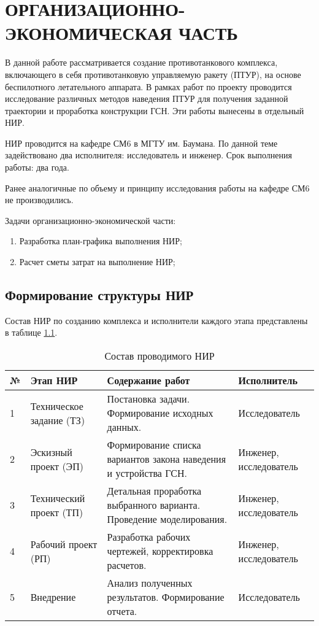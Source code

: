 \chapter{ОРГАНИЗАЦИОННО-ЭКОНОМИЧЕСКАЯ ЧАСТЬ}
\label{cha:ch_5}

В данной работе рассматривается создание противотанкового комплекса, включающего в себя противотанковую управляемую ракету (ПТУР), на основе беспилотного летательного аппарата. В рамках работ по проекту проводится исследование различных методов наведения ПТУР для получения заданной траектории и проработка конструкции ГСН. Эти работы вынесены в отдельный НИР.

НИР проводится на кафедре СМ6 в МГТУ им. Баумана. По данной теме задействовано два исполнителя: исследователь и инженер. Срок выполнения работы: два года.

Ранее аналогичные по объему и принципу исследования работы на кафедре СМ6 не производились.

Задачи организационно-экономической части:
\begin{enumerate}[1.]
	\item Разработка план-графика выполнения НИР;
	\item Расчет сметы затрат на выполнение НИР;
\end{enumerate}

\clearpage
\section{Формирование структуры НИР}
Состав НИР по созданию комплекса и исполнители каждого этапа представлены в таблице \ref{tab:econ_nir_struct}.
\begin{table}[h]
	\begin{center}
		\caption{Состав проводимого НИР}
		\begin{tabular}{|p{8mm}|p{30mm}|p{70mm}|p{40mm}|}
  		\hline
№ & Этап НИР & Содержание работ & Исполнитель \\ \hline
1 & Техническое задание (ТЗ) & Постановка задачи. Формирование исходных данных. & Исследователь \\ \hline
2 & Эскизный проект (ЭП) & Формирование списка вариантов закона наведения и устройства ГСН. & Инженер, исследователь \\ \hline
3 & Технический проект (ТП) & Детальная проработка выбранного варианта. Проведение моделирования. & Инженер, исследователь \\ \hline
4 & Рабочий проект (РП) & Разработка рабочих чертежей, корректировка расчетов. & Инженер, исследователь \\ \hline
5 & Внедрение & Анализ полученных результатов. Формирование отчета. & Исследователь \\ \hline
		\end{tabular}
		\label{tab:econ_nir_struct}
	\end{center}
\end{table}

